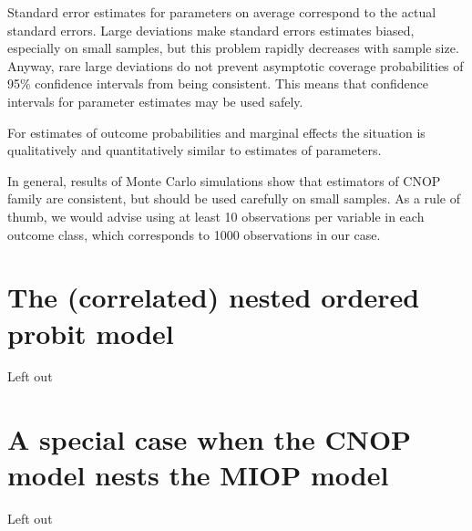 \documentclass[letterpaper,fleqn,11pt]{article}
\begin{document}
\begin{onehalfspace}
Standard error estimates for parameters on average correspond to the actual
standard errors. Large deviations make standard errors estimates biased,
especially on small samples, but this problem rapidly decreases with sample
size. Anyway, rare large deviations do not prevent asymptotic coverage
probabilities of 95\% confidence intervals from being consistent. This means
that confidence intervals for parameter estimates may be used safely.

For estimates of outcome probabilities and marginal effects the situation is
qualitatively and quantitatively similar to estimates of parameters.

In general, results of Monte Carlo simulations show that estimators of CNOP
family are consistent, but should be used carefully on small samples. As a
rule of thumb, we would advise using at least 10 observations per variable
in each outcome class, which corresponds to 1000 observations in our case.

\section{\protect\Large The (correlated) nested ordered probit model}

Left out

\section*{\protect\Large A special case when the CNOP model nests the MIOP
model\ }

Left out



\end{onehalfspace}
\end{document}
